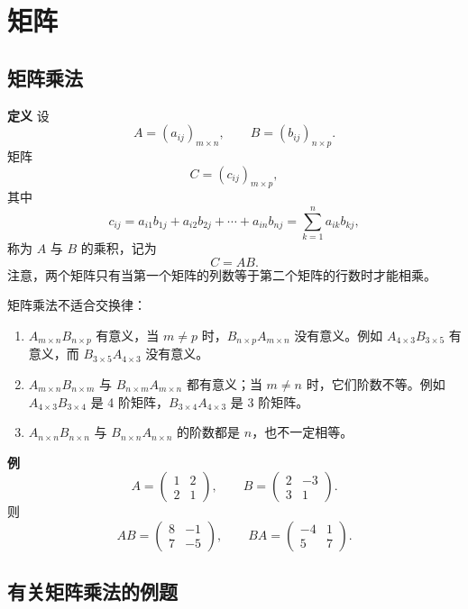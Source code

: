 \chapter{矩阵}

\section{矩阵乘法}

\textbf{定义} 设
\[
 A=(a_{ij})_{m\times n},\qquad B=(b_{ij})_{n\times p}.
\]
矩阵
\[
 C=(c_{ij})_{m\times p},
\]
其中
\[
 c_{ij}=a_{i1}b_{1j}+a_{i2}b_{2j}+\cdots+a_{in}b_{nj}
      =\sum_{k=1}^{n}a_{ik}b_{kj},
\]
称为 $A$ 与 $B$ 的乘积，记为
\[
 C=AB.
\]
注意，两个矩阵只有当第一个矩阵的列数等于第二个矩阵的行数时才能相乘。

矩阵乘法不适合交换律：
\begin{enumerate}[label=\roman*),leftmargin=2.4em,itemsep=0.35em]
\item $A_{m\times n}B_{n\times p}$ 有意义，当 $m\ne p$ 时，$B_{n\times p}A_{m\times n}$ 没有意义。例如 $A_{4\times3}B_{3\times5}$ 有意义，而 $B_{3\times5}A_{4\times3}$ 没有意义。
\item $A_{m\times n}B_{n\times m}$ 与 $B_{n\times m}A_{m\times n}$ 都有意义；当 $m\ne n$ 时，它们阶数不等。例如 $A_{4\times3}B_{3\times4}$ 是 4 阶矩阵，$B_{3\times4}A_{4\times3}$ 是 3 阶矩阵。
\item $A_{n\times n}B_{n\times n}$ 与 $B_{n\times n}A_{n\times n}$ 的阶数都是 $n$，也不一定相等。
\end{enumerate}

\textbf{例}
\[
 A=\begin{pmatrix}1&2\\2&1\end{pmatrix},\qquad
 B=\begin{pmatrix}2&-3\\3&1\end{pmatrix}.
\]
则
\[
 AB=\begin{pmatrix}8&-1\\7&-5\end{pmatrix},\qquad
 BA=\begin{pmatrix}-4&1\\5&7\end{pmatrix}.
\]

\section{有关矩阵乘法的例题}


